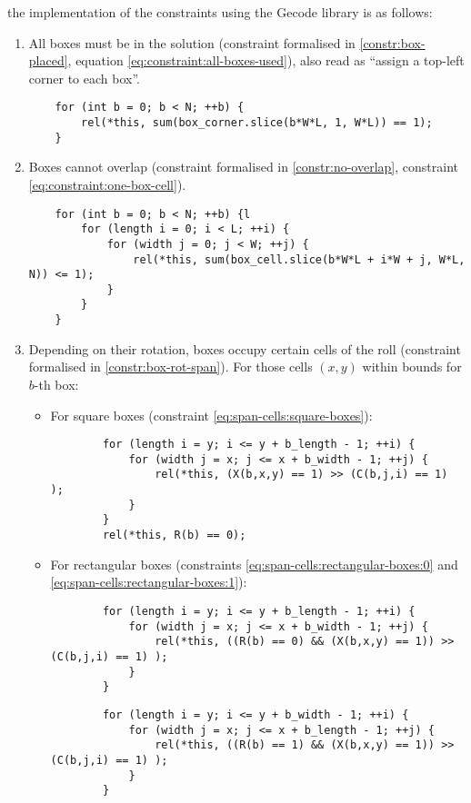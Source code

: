 the implementation of the constraints using the Gecode library is as follows:

\begin{enumerate}
    \item All boxes must be in the solution (constraint formalised in
    \ref{constr:box-placed}, equation \ref{eq:constraint:all-boxes-used}),
    also read as ``assign a top-left corner to each box''.
    
	{\NOINDENT \begin{lstlisting}
	for (int b = 0; b < N; ++b) {
		rel(*this, sum(box_corner.slice(b*W*L, 1, W*L)) == 1);
	}
	\end{lstlisting}}
    
    \item Boxes cannot overlap (constraint formalised in
    \ref{constr:no-overlap}, constraint \ref{eq:constraint:one-box-cell}).
    
    {\NOINDENT \begin{lstlisting}
	for (int b = 0; b < N; ++b) {l
		for (length i = 0; i < L; ++i) {
			for (width j = 0; j < W; ++j) {
				rel(*this, sum(box_cell.slice(b*W*L + i*W + j, W*L, N)) <= 1);
			}
		}
	}
	\end{lstlisting}}
    
    \item Depending on their rotation, boxes occupy certain cells of the roll
    (constraint formalised in \ref{constr:box-rot-span}). For those cells $(x,y)$ within
    bounds for $b$-th box:

	\begin{itemize}
		\item For square boxes (constraint \ref{eq:span-cells:square-boxes}):
		{\NOINDENT \begin{lstlisting}
		for (length i = y; i <= y + b_length - 1; ++i) {
			for (width j = x; j <= x + b_width - 1; ++j) {
				rel(*this, (X(b,x,y) == 1) >> (C(b,j,i) == 1) );
			}
		}
		rel(*this, R(b) == 0);
		\end{lstlisting}}
		
		\item For rectangular boxes (constraints \ref{eq:span-cells:rectangular-boxes:0} and
		\ref{eq:span-cells:rectangular-boxes:1}):
		{\NOINDENT \begin{lstlisting}
		for (length i = y; i <= y + b_length - 1; ++i) {
			for (width j = x; j <= x + b_width - 1; ++j) {
				rel(*this, ((R(b) == 0) && (X(b,x,y) == 1)) >> (C(b,j,i) == 1) );
			}
		}
		\end{lstlisting}}
		{\NOINDENT \begin{lstlisting}
		for (length i = y; i <= y + b_width - 1; ++i) {
			for (width j = x; j <= x + b_length - 1; ++j) {
				rel(*this, ((R(b) == 1) && (X(b,x,y) == 1)) >> (C(b,j,i) == 1) );
			}
		}
		\end{lstlisting}}
	\end{itemize}
    

\end{enumerate}
